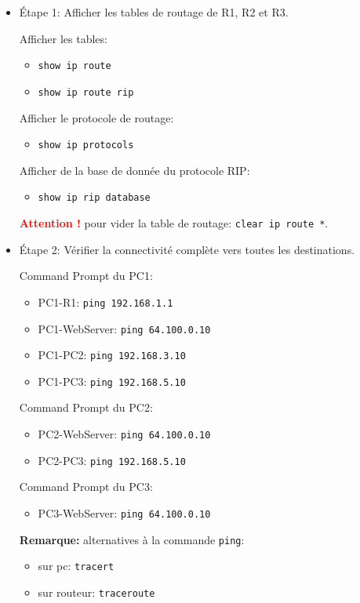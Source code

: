 \documentclass[a4paper]{article}
\begin{document}
\begin{itemize}
    \item Étape 1: Afficher les tables de routage de R1, R2 et R3.
    \begin{example}
        Afficher les tables:
        \begin{itemize}
            \item \texttt{show ip route}
            \item \texttt{show ip route rip}
        \end{itemize}
        Afficher le protocole de routage:
        \begin{itemize}
            \item \texttt{show ip protocols}
        \end{itemize}
        Afficher de la base de donnée du protocole RIP:
        \begin{itemize}
            \item \texttt{show ip rip database}
        \end{itemize}
        \textcolor{red}{\textbf{Attention !}} pour vider la table de routage: \texttt{clear ip route *}.
    \end{example}
    \item Étape 2: Vérifier la connectivité complète vers toutes les destinations.
    \begin{example}
        Command Prompt du PC1:
        \begin{itemize}
            \item PC1-R1: \texttt{ping 192.168.1.1}
            \item PC1-WebServer: \texttt{ping 64.100.0.10}
            \item PC1-PC2: \texttt{ping 192.168.3.10}
            \item PC1-PC3: \texttt{ping 192.168.5.10}
        \end{itemize}
        Command Prompt du PC2:
        \begin{itemize}
            \item PC2-WebServer: \texttt{ping 64.100.0.10}
            \item PC2-PC3: \texttt{ping 192.168.5.10}
        \end{itemize}
        Command Prompt du PC3:
        \begin{itemize}
            \item PC3-WebServer: \texttt{ping 64.100.0.10}
        \end{itemize}
        \textbf{Remarque:} alternatives à la commande \texttt{ping}:
        \begin{itemize}
            \item sur pc: \texttt{tracert}
            \item sur routeur: \texttt{traceroute}
        \end{itemize}
    \end{example}
\end{itemize}
\end{document}
